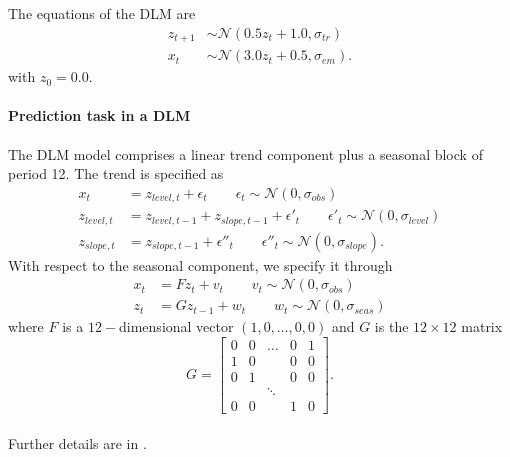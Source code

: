 The equations of the DLM are 
\begin{align*}
    z_{t+1} &\sim \mathcal{N}(0.5z_t + 1.0,\sigma_{tr}) \\
    x_{t} &\sim \mathcal{N}(3.0z_t + 0.5, \sigma_{em}).
\end{align*}
with $z_0  = 0.0$.


\paragraph{Prediction task in a DLM}
The DLM model comprises a linear trend component plus a seasonal block of period 12. The trend is specified as
\begin{align*}
x_t &= z_{level,t} + \epsilon_t \qquad \epsilon_t \sim \mathcal{N}(0, \sigma_{obs}) \\
z_{level,t} &= z_{level,t-1} + z_{slope,t-1} + \epsilon'_t \qquad \epsilon'_t \sim \mathcal{N}(0, \sigma_{level}) \\
z_{slope,t} &= z_{slope,t-1} + \epsilon''_t \qquad \epsilon''_t \sim \mathcal{N}(0, \sigma_{slope}).
\end{align*}
With respect to the seasonal component,
we specify it through
\begin{align*}
x_t &= F z_t + v_t \qquad v_t \sim \mathcal{N}(0, \sigma_{obs})\\
z_t &= G z_{t-1} + w_t \qquad w_t \sim \mathcal{N}(0, \sigma_{seas})
\end{align*}
where $F$ is a $12-$dimensional vector
$( 1,0,\ldots, 0,0)$ 
and $G$ is the $12\times 12$ matrix 
\begin{equation*}
G = \begin{bmatrix}
0 & 0 & \ldots & 0 & 1 \\
1 &	0 & & 0 & 0 \\
0 & 1 & & 0 & 0 \\
 & & \ddots & & \\
 0 & 0 & & 1 & 0
\end{bmatrix}.
\end{equation*}
\\
Further details are in \cite{westharrison}.
\iffalse
